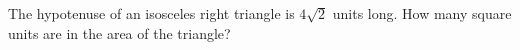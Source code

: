 The hypotenuse of an isosceles right triangle is $4\sqrt2$ units long. How many square units are in the area of the triangle?
